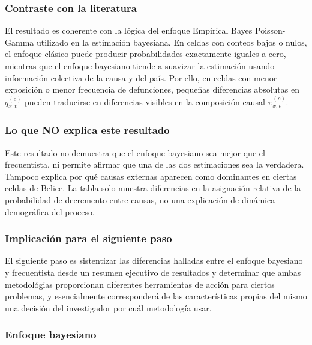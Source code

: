 \documentclass[
  spanish,
  letterpaper,
  DIV=11,
  numbers=noendperiod]{scrartcl}
\begin{document}
\subsubsection{Contraste con la
literatura}\label{contraste-con-la-literatura-1}

El resultado es coherente con la lógica del enfoque Empirical Bayes
Poisson-Gamma utilizado en la estimación bayesiana. En celdas con
conteos bajos o nulos, el enfoque clásico puede producir probabilidades
exactamente iguales a cero, mientras que el enfoque bayesiano tiende a
suavizar la estimación usando información colectiva de la causa y del
país. Por ello, en celdas con menor exposición o menor frecuencia de
defunciones, pequeñas diferencias absolutas en \(q_{x,t}^{(c)}\) pueden
traducirse en diferencias visibles en la composición causal
\(\pi_{x,t}^{(c)}\).

\subsubsection{Lo que NO explica este
resultado}\label{lo-que-no-explica-este-resultado-1}

Este resultado no demuestra que el enfoque bayesiano sea mejor que el
frecuentista, ni permite afirmar que una de las dos estimaciones sea la
verdadera. Tampoco explica por qué causas externas aparecen como
dominantes en ciertas celdas de Belice. La tabla solo muestra
diferencias en la asignación relativa de la probabilidad de decremento
entre causas, no una explicación de dinámica demográfica del proceso.

\subsubsection{Implicación para el siguiente
paso}\label{implicaciuxf3n-para-el-siguiente-paso-1}

El siguiente paso es sistentizar las diferencias halladas entre el
enfoque bayesiano y frecuentista desde un resumen ejecutivo de
resultados y determinar que ambas metodológias proporcionan diferentes
herramientas de acción para ciertos problemas, y esencialmente
corresponderá de las características propias del mismo una decisión del
investigador por cuál metodología usar.

\subsubsection{Enfoque bayesiano}\label{enfoque-bayesiano}
\end{document}
